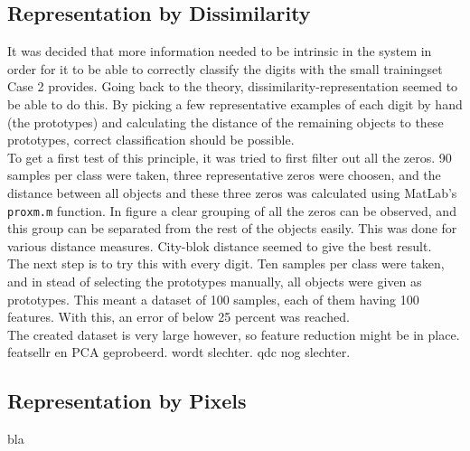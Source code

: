 \subsection{Representation by Dissimilarity}
It was decided that more information needed to be intrinsic in the system in order for it to be able to correctly classify the digits with the small trainingset Case 2 provides. Going back to the theory, dissimilarity-representation seemed to be able to do this. By picking a few representative examples of each digit by hand (the prototypes) and calculating the distance of the remaining objects to these prototypes, correct classification should be possible. \\
\noindent To get a first test of this principle, it was tried to first filter out all the zeros. 90 samples per class were taken, three representative zeros were choosen, and the distance between all objects and these three zeros was calculated using MatLab's \texttt{proxm.m} function. In figure  a clear grouping of all the zeros can be observed, and this group can be separated from the rest of the objects easily. This was done for various distance measures. City-blok distance seemed to give the best result.  \\
\noindent The next step is to try this with every digit. Ten samples per class were taken, and in stead of selecting the prototypes manually, all objects were given as prototypes. This meant a dataset of 100 samples, each of them having 100 features. With this, an error of below 25 percent was reached.  \\
\noindent The created dataset is very large however, so feature reduction might be in place. 
featsellr en PCA geprobeerd. wordt slechter. qdc nog slechter. 

\subsection{Representation by Pixels}
bla


